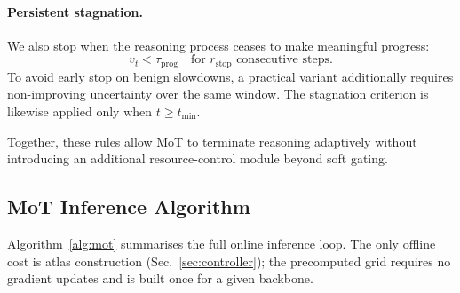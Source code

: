 \documentclass{article}
\begin{document}
\paragraph{Persistent stagnation.}
We also stop when the reasoning process ceases to make meaningful progress:
\begin{equation}
v_t < \tau_{\mathrm{prog}}
\quad \text{for } r_{\mathrm{stop}} \text{ consecutive steps}.
\label{eq:stagnation}
\end{equation}
To avoid early stop on benign slowdowns, a practical variant additionally requires non-improving uncertainty over the same window. The stagnation criterion is likewise applied only when $t \geq t_{\min}$.

Together, these rules allow MoT to terminate reasoning adaptively without introducing an additional resource-control module beyond soft gating.

\subsection{MoT Inference Algorithm}
\label{sec:algo}

Algorithm~\ref{alg:mot} summarises the full online inference loop. The only offline cost is atlas construction (Sec.~\ref{sec:controller}); the precomputed grid requires no gradient updates and is built once for a given backbone.
\end{document}
